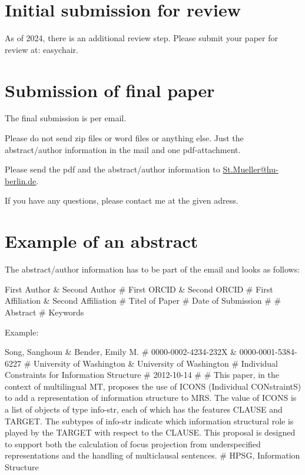 \documentclass[11pt,a4paper,fleqn]{article}
\begin{document}
\section{Initial submission for review}

As of 2024, there is an additional review step. Please submit your paper for review at: easychair.%

\section{Submission of final paper}

The final submission is per email.

Please do not send zip files
or word files or anything else. Just the abstract/author information in the mail and one pdf-attachment.

Please send the pdf and the abstract/author information to
\href{mailto:St.Mueller@hu-berlin.de}{St.Mueller@hu-berlin.de}. 


If you have any questions, please contact me at the given adress.



\section{Example of an abstract}

The abstract/author information has to be part of the email and looks as follows:

First Author \& Second Author \# First ORCID \& Second ORCID \# First Affiliation \& Second Affiliation \# Titel of Paper \# Date of
Submission \# \# Abstract \# Keywords

\bigskip

Example:

\medskip
\noindent
Song, Sanghoun \& Bender, Emily M. \# 0000-0002-4234-232X \& 0000-0001-5384-6227 \# University of Washington \& University of Washington \#
Individual Constraints for Information Structure \# 2012-10-14 \# \#
This paper, in the context of multilingual MT, proposes the use of ICONS
(Individual CONstraintS) to add a representation of information structure to
MRS. The value of ICONS is a list of objects of type info-str, each of which
has the features CLAUSE and TARGET. The subtypes of info-str indicate
which information structural role is played by the TARGET with respect
to the CLAUSE. This proposal is designed to support both the calculation
of focus projection from underspecified representations and the handling of
multiclausal sentences. \# HPSG, Information Structure

\medskip



% 
%
\end{document}
